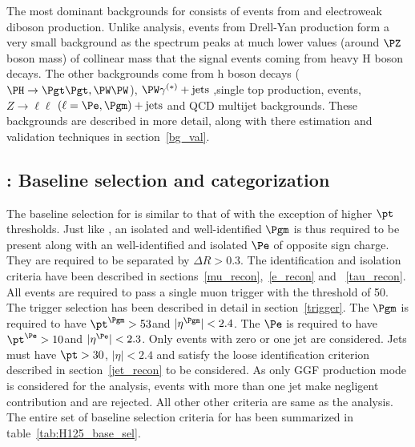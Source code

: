The most dominant backgrounds for \Hmue consists of events from  \ttb and electroweak diboson production. Unlike \hmue analysis, \ztt events from Drell-Yan production form a very small background as the \ztt spectrum peaks at much lower values (around $\PZ$ boson mass) of collinear mass that the signal events coming from heavy H boson decays. The other backgrounds come from h boson decays ($\PH \to \Pgt\Pgt,\PW\PW$), $\PW\gamma^{(*)}+\text{jets}$ ,single top production, \wjets events, $Z\to\ell\ell$ $(\ell = \Pe, \Pgm)+\text{jets}$ and QCD multijet backgrounds. These backgrounds are described in more detail, along with there estimation and validation techniques in section~\ref{bg_val}.        

\subsection{\Hmue: Baseline selection and categorization}
\label{H_presel_cat}
The baseline selection for \Hmue is similar to that of \hmue with the exception of higher $\pt$ thresholds. Just like \hmue, an isolated and well-identified $\Pgm$ is thus required to be present along with an well-identified and isolated $\Pe$ of opposite sign charge. They are required to be separated by $\Delta R > 0.3$. The identification and isolation criteria have been described in sections~\ref{mu_recon},~\ref{e_recon} and ~\ref{tau_recon}. All events are required to pass a single muon trigger with the threshold of 50\GeV. The trigger selection has been described in detail in section~\ref{trigger}. The $\Pgm$ is required to have $\pt^{\Pgm} > 53$\GeV and $|\eta^{\Pgm}|<2.4$. The $\Pe$ is required to have $\pt^{\Pe} > 10$\GeV and $|\eta^{\Pe}|<2.3$. Only events with zero or one jet are considered. Jets  must have $\pt>30$\GeV, $|\eta| < 2.4 $ and satisfy the loose identification criterion described in section~\ref{jet_recon} to be considered. As only GGF production mode is considered for the \Hmue analysis, events with more than one jet make negligent contribution and are rejected. All other other criteria are same as the \hmue analysis. The entire set of baseline selection criteria for \Hmue has been summarized in table~\ref{tab:H125_base_sel}.

